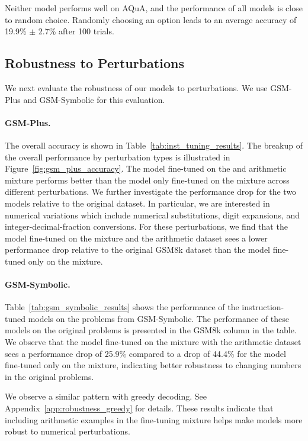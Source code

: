 Neither model performs well on AQuA, and the performance of all models is close to random choice. Randomly choosing an option leads to an average accuracy of 19.9\% $\pm$ 2.7\% after 100 trials.

\subsection{Robustness to Perturbations}
We next evaluate the robustness of our models to perturbations. We use GSM-Plus and GSM-Symbolic for this evaluation.

\paragraph{GSM-Plus.}
The overall accuracy is shown in Table~\ref{tab:inst_tuning_results}. The breakup of the overall performance by perturbation types is illustrated in Figure~\ref{fig:gsm_plus_accuracy}. The model fine-tuned on the \tulu{} and arithmetic mixture performs better than the model only fine-tuned on the \tulu{} mixture across different perturbations. We further investigate the performance drop for the two models relative to the original \gsm{} dataset. In particular, we are interested in numerical variations which include numerical substitutions, digit expansions, and integer-decimal-fraction conversions. For these perturbations, we find that the model fine-tuned on the \tulu{} mixture and the arithmetic dataset sees a lower performance drop relative to the original GSM8k dataset than the model fine-tuned only on the \tulu{} mixture.




\paragraph{GSM-Symbolic.}
Table~\ref{tab:gsm_symbolic_results} shows the performance of the instruction-tuned models on the problems from GSM-Symbolic. The performance of these models on the original problems is presented in the GSM8k column in the table. We observe that the model fine-tuned on the \tulu{} mixture with the arithmetic dataset sees a performance drop of 25.9\% compared to a drop of 44.4\% for the model fine-tuned only on the \tulu{} mixture, indicating better robustness to changing numbers in the original problems.

We observe a similar pattern with greedy decoding. See Appendix~\ref{app:robustness_greedy} for details. These results indicate that including arithmetic examples in the fine-tuning mixture helps make models more robust to numerical perturbations.
